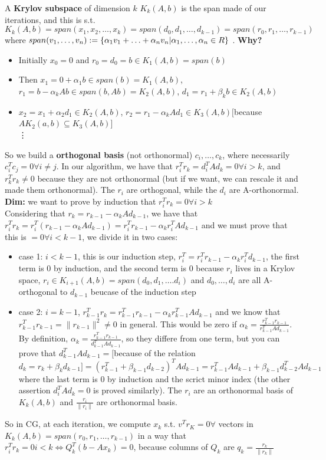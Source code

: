 \documentclass{article}
\begin{document}
A \textbf{Krylov subspace} of dimension $k$ $K_{k}(A, b)$ is the span made of our iterations, and this is s.t. $K_{k}(A, b) = span(x_{1}, x_{2}, \hdots, x_{k}) = span(d_{0}, d_{1}, \hdots, d_{k-1}) = span(r_{0}, r_{1}, \hdots, r_{k-1})$ where $span(v_{1}, \hdots, v_{n}) := \{\alpha_{1}v_{1} + \hdots + \alpha_{n}v_{n}\\| \alpha_{1}, \hdots, \alpha_{n} \in R\}$ . \textbf{Why?} \begin{itemize}
\item Initially $x_{0} = 0$ and $r_{0} = d_{0} = b \in K_{1}(A, b) = span(b)$
\item Then $x_{1} = 0 + \alpha_{1}b \in span(b) = K_{1}(A, b)$, $r_{1} = b - \alpha_{k}Ab \in span(b, Ab) = K_{2}(A, b)$, $d_{1} = r_{1} + \beta_{k}b \in K_{2}(A, b)$
\item $x_{2} = x_{1} + \alpha_{2}d_{1} \in K_{2}(A, b)$, $r_{2} = r_{1} - \alpha_{k}Ad_{1} \in K_{3}(A, b) [$because $ AK_{2}(a, b) \subseteq K_{3}(A, b)$]
\\\vdots
\end{itemize}
So we build a \textbf{orthogonal basis} (not orthonormal) $c_{i}, \hdots, c_{k}$, where necessarily $c_{i}^{T}c_{j} = 0  \forall i \neq j$. In our algorithm, we have that $r_{i}^{T}r_{k} = d_{i}^{T}Ad_{k} = 0 \forall i > k$, and $r_{k}^{T}r_{k} \neq 0$ because they are not orthonormal (but if we want, we can rescale it and made them orthonormal). The $r_{i}$ are orthogonal, while the $d_{i}$ are A-orthonormal.
\\\textbf{Dim:} we want to prove by induction that $r_{i}^{T}r_{k} = 0 \forall i > k$
\\Considering that $r_{k} = r_{k-1} - \alpha_{k}Ad_{k-1}$, we have that $r_{i}^{T}r_{k} = r_{i}^{T}(r_{k-1} - \alpha_{k}A d_{k-1}) = r_{i}^{T}r_{k-1} - \alpha_{k}r_{i}^{T}Ad_{k-1}$ and we must prove that this is $= 0 \forall i < k-1$, we divide it in two cases:
\begin{itemize}
\item case 1: $i < k-1$, this is our induction step, $r_{i}^{T} = r_{i}^{T}r_{k-1} - \alpha_{k}r_{i}^{T}d_{k-1}$, the first term is $0$ by induction, and the second term is $0$ because $r_{i}$ lives in a Krylov space, $r_{i} \in K_{i+1}(A, b) = span(d_{0}, d_{1}, \hdots. d_{i})$ and $d_{0}, \hdots, d_{i}$ are all A-orthogonal to $d_{k-1}$ beucase of the induction step
\item case 2: $i = k-1$, $r_{k-1}^{T}r_{k} = r_{k-1}^{T}r_{k-1} - \alpha_{k}r_{k-1}^{T}Ad_{k-1}$ and we know that $r_{k-1}^{T}r_{k-1} = \|r_{k-1}\|^{2}  \neq 0$ in general. This would be zero if $\alpha_{k} = \frac{r_{k-1}^{T}r_{k-1}}{r_{k-1}^{T}Ad_{k-1}}$. By definition, $\alpha_{k} = \frac{r_{k-1}^{T}r_{k-1}}{d_{k-1}^{T}Ad_{k-1}}$, so they differe from one term, but you can prove that $d_{k-1}^{T}Ad_{k-1} = [$because of the relation $d_{k} = r_{k} + \beta_{k}d_{k-1}] = (r_{k-1}^{T}+\beta_{k-1}d_{k-2})^{T}Ad_{k-1} = r_{k-1}^{T}Ad_{k-1} + \beta_{k-1}d_{k-2}^{T}Ad_{k-1}$ where the last term is $0$ by induction and the scrict minor index (the other assertion $d_{i}^{T}Ad_{k} = 0$ is proved similarly). The $r_{i}$ are an orthonormal basis of $K_{k}(A, b)$ and $\frac{r_{i}}{\|r_{i}\|}$ are orthonormal basis.
\end{itemize}
So in CG, at each iteration, we compute $x_{k}$ s.t. $v^{T}r_{K} = 0 \forall$ vectors in $K_{k}(A, b) = span(r_{0}, r_{1}, \hdots, r_{k-1})$ in a way that $r_{i}^{T}r_{k} = 0 i < k \iff Q_{k}^{T}(b - Ax_{k}) = 0$, because columns of $Q_{k}$ are $q_{k} = \frac{r_{k}}{\|r_{k}\|}$
\end{document}
